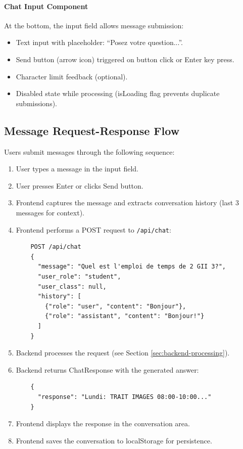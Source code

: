 \paragraph{Chat Input Component}
At the bottom, the input field allows message submission:

\begin{itemize}
    \item Text input with placeholder: ``Posez votre question...''.
    \item Send button (arrow icon) triggered on button click or Enter key press.
    \item Character limit feedback (optional).
    \item Disabled state while processing (isLoading flag prevents duplicate submissions).
\end{itemize}

\subsection{Message Request-Response Flow}

Users submit messages through the following sequence:

\begin{enumerate}
    \item User types a message in the input field.
    \item User presses Enter or clicks Send button.
    \item Frontend captures the message and extracts conversation history (last 3 messages for context).
    \item Frontend performs a POST request to \texttt{/api/chat}:
    \begin{verbatim}
    POST /api/chat
    {
      "message": "Quel est l'emploi de temps de 2 GII 3?",
      "user_role": "student",
      "user_class": null,
      "history": [
        {"role": "user", "content": "Bonjour"},
        {"role": "assistant", "content": "Bonjour!"}
      ]
    }
    \end{verbatim}
    \item Backend processes the request (see Section \ref{sec:backend-processing}).
    \item Backend returns ChatResponse with the generated answer:
    \begin{verbatim}
    {
      "response": "Lundi: TRAIT IMAGES 08:00-10:00..."
    }
    \end{verbatim}
    \item Frontend displays the response in the conversation area.
    \item Frontend saves the conversation to localStorage for persistence.
\end{enumerate}

